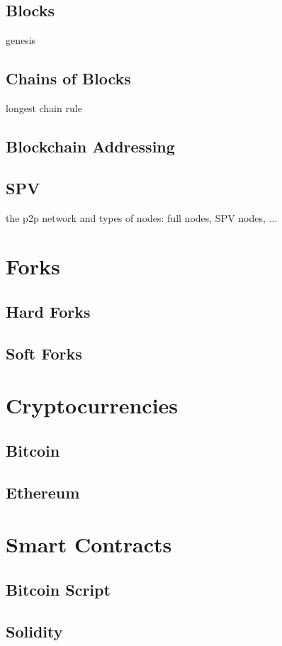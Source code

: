 \subsection{Blocks}
genesis
\subsection{Chains of Blocks}
longest chain rule
\subsection{Blockchain Addressing}
\subsection{SPV}
the p2p network and types of nodes: full nodes, SPV nodes, ...

\section{Forks}
\subsection{Hard Forks}
\subsection{Soft Forks}

\section{Cryptocurrencies}
\subsection{Bitcoin}
\subsection{Ethereum}

\section{Smart Contracts}
\subsection{Bitcoin Script}
\subsection{Solidity}

